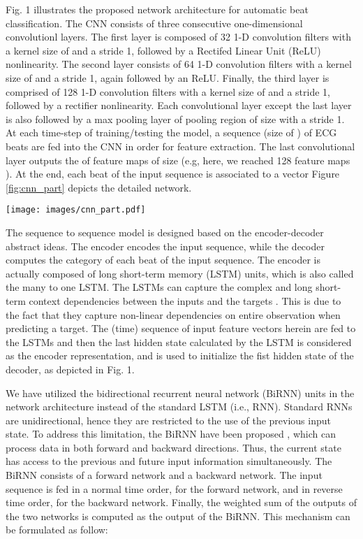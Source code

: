 \documentclass{article}
\begin{document}
Fig. 1 illustrates the proposed network architecture  for automatic beat classification.
The CNN  consists of three consecutive one-dimensional convolutionl layers. The first layer is composed of 32 1-D convolution filters with a kernel size of  and a stride 1, followed by a Rectifed Linear Unit (ReLU) nonlinearity. The second layer consists of 64 1-D convolution filters with a kernel size of  and a stride 1, again followed by an ReLU. Finally, the third layer is comprised of 128 1-D convolution filters with a kernel size of  and a stride 1, followed by a rectifier nonlinearity. Each convolutional layer except the last layer is also followed by a max pooling layer of pooling region of size  with a stride 1. At each time-step of training/testing the model, a sequence (size of ) of ECG beats are fed into the CNN in order for feature extraction. The last convolutional layer outputs
the  of  feature maps of size  (e.g, here, we reached 128 feature maps ). At the end, each beat of the input sequence is associated to a vector  Figure \ref{fig:cnn_part} depicts the detailed network. 

\begin{figure*}[htb]
\centering
\texttt{[image: images/cnn\_part.pdf]}
  \caption{A diagram of convolutional layers used in the proposed model.} 
  \label{fig:cnn_part}
\end{figure*}




The sequence to sequence model is designed based on the encoder-decoder abstract ideas. The encoder encodes the input sequence, while the decoder computes the category of each beat of the input sequence. The encoder is actually composed of long short-term memory (LSTM) units, which is also called the many to one LSTM. The LSTMs can capture the complex and long short-term context dependencies between the inputs and the targets \cite{fernandez2015using}. This is due to the fact that they capture non-linear dependencies on entire observation when predicting a target. The (time) sequence of input feature vectors herein are fed to the LSTMs and then the last hidden state calculated by the LSTM is considered as the encoder representation, and is used to initialize the fist hidden state of the decoder, as depicted in Fig. 1.

We have utilized the bidirectional recurrent neural network (BiRNN) units in the network architecture instead of the standard LSTM (i.e., RNN). Standard RNNs are unidirectional, hence they are restricted to the use of the previous input state. To address this limitation, the BiRNN have been proposed \cite{schuster1997bidirectional}, which can process data in both forward and backward directions. Thus, the current state has access to the previous and future input information simultaneously. The BiRNN consists of a forward network and a backward network. The input sequence is fed in a normal time order,  for the forward network, and in reverse time order,  for the backward network. Finally, the weighted sum of the outputs of the two networks is computed as the output of the BiRNN. This mechanism can be formulated as follow:
\end{document}
